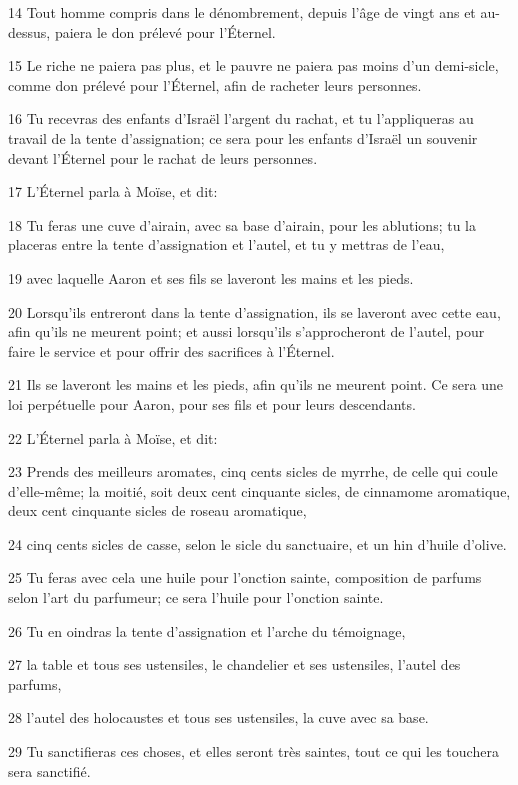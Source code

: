 \par 14 Tout homme compris dans le dénombrement, depuis l'âge de vingt ans et au-dessus, paiera le don prélevé pour l'Éternel.
\par 15 Le riche ne paiera pas plus, et le pauvre ne paiera pas moins d'un demi-sicle, comme don prélevé pour l'Éternel, afin de racheter leurs personnes.
\par 16 Tu recevras des enfants d'Israël l'argent du rachat, et tu l'appliqueras au travail de la tente d'assignation; ce sera pour les enfants d'Israël un souvenir devant l'Éternel pour le rachat de leurs personnes.
\par 17 L'Éternel parla à Moïse, et dit:
\par 18 Tu feras une cuve d'airain, avec sa base d'airain, pour les ablutions; tu la placeras entre la tente d'assignation et l'autel, et tu y mettras de l'eau,
\par 19 avec laquelle Aaron et ses fils se laveront les mains et les pieds.
\par 20 Lorsqu'ils entreront dans la tente d'assignation, ils se laveront avec cette eau, afin qu'ils ne meurent point; et aussi lorsqu'ils s'approcheront de l'autel, pour faire le service et pour offrir des sacrifices à l'Éternel.
\par 21 Ils se laveront les mains et les pieds, afin qu'ils ne meurent point. Ce sera une loi perpétuelle pour Aaron, pour ses fils et pour leurs descendants.
\par 22 L'Éternel parla à Moïse, et dit:
\par 23 Prends des meilleurs aromates, cinq cents sicles de myrrhe, de celle qui coule d'elle-même; la moitié, soit deux cent cinquante sicles, de cinnamome aromatique, deux cent cinquante sicles de roseau aromatique,
\par 24 cinq cents sicles de casse, selon le sicle du sanctuaire, et un hin d'huile d'olive.
\par 25 Tu feras avec cela une huile pour l'onction sainte, composition de parfums selon l'art du parfumeur; ce sera l'huile pour l'onction sainte.
\par 26 Tu en oindras la tente d'assignation et l'arche du témoignage,
\par 27 la table et tous ses ustensiles, le chandelier et ses ustensiles, l'autel des parfums,
\par 28 l'autel des holocaustes et tous ses ustensiles, la cuve avec sa base.
\par 29 Tu sanctifieras ces choses, et elles seront très saintes, tout ce qui les touchera sera sanctifié.
